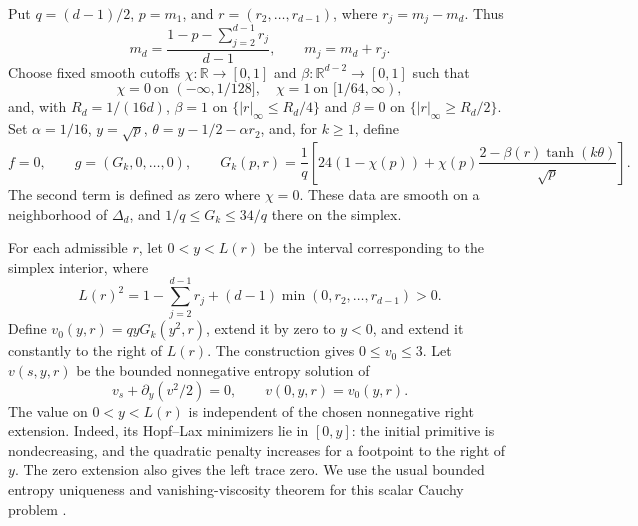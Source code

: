 \documentclass[11pt]{article}
\begin{document}
Put $q=(d-1)/2$, $p=m_1$, and $r=(r_2,\ldots,r_{d-1})$, where $r_j=m_j-m_d$. Thus
\[
 m_d=\frac{1-p-\sum_{j=2}^{d-1}r_j}{d-1},\qquad m_j=m_d+r_j.
\]
Choose fixed smooth cutoffs $\chi:\mathbb R\to[0,1]$ and $\beta:\mathbb R^{d-2}\to[0,1]$ such that
\[
 \chi=0\ \text{on }(-\infty,1/128],\quad \chi=1\ \text{on }[1/64,\infty),
\]
and, with $R_d=1/(16d)$, $\beta=1$ on $\{|r|_\infty\le R_d/4\}$ and $\beta=0$ on $\{|r|_\infty\ge R_d/2\}$. Set $\alpha=1/16$, $y=\sqrt p$, $\theta=y-1/2-\alpha r_2$, and, for $k\ge1$, define
\begin{equation}\label{data}
 f=0,\qquad g=(G_k,0,\ldots,0),\qquad
 G_k(p,r)=\frac1q\left[24(1-\chi(p))+\chi(p)\frac{2-\beta(r)\tanh(k\theta)}{\sqrt p}\right].
\end{equation}
The second term is defined as zero where $\chi=0$. These data are smooth on a neighborhood of $\Delta_d$, and $1/q\le G_k\le34/q$ there on the simplex.

For each admissible $r$, let $0<y<L(r)$ be the interval corresponding to the simplex interior, where
\[
 L(r)^2=1-\sum_{j=2}^{d-1}r_j+(d-1)\min(0,r_2,\ldots,r_{d-1})>0.
\]
Define $v_0(y,r)=qyG_k(y^2,r)$, extend it by zero to $y<0$, and extend it constantly to the right of $L(r)$. The construction gives $0\le v_0\le3$. Let $v(s,y,r)$ be the bounded nonnegative entropy solution of
\begin{equation}\label{burgers}
 v_s+\partial_y(v^2/2)=0,\qquad v(0,y,r)=v_0(y,r).
\end{equation}
The value on $0<y<L(r)$ is independent of the chosen nonnegative right extension. Indeed, its Hopf--Lax minimizers lie in $[0,y]$: the initial primitive is nondecreasing, and the quadratic penalty increases for a footpoint to the right of $y$. The zero extension also gives the left trace zero. We use the usual bounded entropy uniqueness and vanishing-viscosity theorem for this scalar Cauchy problem \cite{Kru}.
\end{document}
